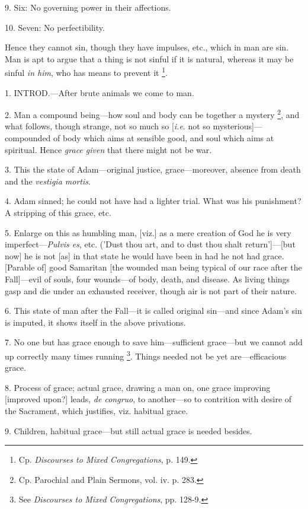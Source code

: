 9. Six: No governing power in their affections.

10. Seven: No perfectibility.

Hence they cannot sin, though they have impulses,
etc., which in man are sin. Man is apt to argue that a thing is not
sinful if it is natural, whereas it may be sinful \emph{in him}, who
has means to prevent it \footnote{Cp. \emph{Discourses to Mixed
Congregations}, p. 149.}.


1. INTROD.—After
brute animals we come to man.

2. Man a compound being—how soul and body can
be together a mystery \footnote{Cp. Parochial and Plain
Sermons, vol. iv. p. 283.},
and what follows, though strange, not so much so [\emph{i.e}. not so
mysterious]—compounded of body which aims at sensible good, and soul
which aims at spiritual. Hence \emph{grace given} that there might not
be war.

3. This the state of Adam—original justice,
grace—moreover, absence from death and the \emph{vestigia mortis}.

4. Adam sinned; he could not have had a lighter
trial. What was his punishment? A stripping of this grace, etc.

5. Enlarge on this as humbling man, [viz.] as a
mere creation of God he is very imperfect—\emph{Pulvis es}, etc.
('Dust thou art, and to dust thou shalt return']—[but now] he is not
[as] in that state he would have been in had he not had grace.
[Parable of] good Samaritan [the wounded man being typical of our race
after the Fall]—evil of souls, four wounds—of body, death, and
disease. As living things gasp and die under an exhausted receiver,
though air is not part of their nature.

6. This state of man after the Fall—it is
called original sin—and since Adam's sin is imputed, it shows itself
in the above privations.

7. No one but has grace enough to save
him—sufficient grace—but we cannot add up correctly many times
running \footnote{See \emph{Discourses to Mixed
Congregations}, pp. 128-9.}. Things needed
not be yet are—efficacious grace.

8. Process of grace; actual grace, drawing a man
on, one grace improving [improved upon?] leads, \emph{de congruo},
to another—so to contrition with desire of the Sacrament, which
justifies, viz. habitual grace.

9. Children, habitual grace—but still actual
grace is needed besides.

